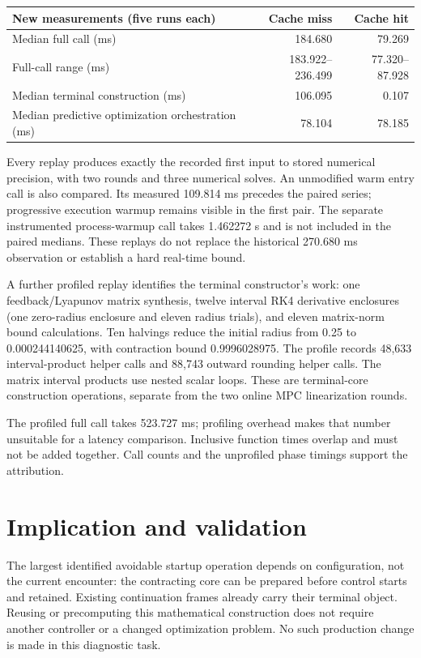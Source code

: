 \documentclass[11pt]{article}
\begin{document}
\begin{center}
\begin{tabular}{lrr}
\toprule
New measurements (five runs each) & Cache miss & Cache hit \\
\midrule
Median full call (ms) & 184.680 & 79.269 \\
Full-call range (ms) & 183.922--236.499 & 77.320--87.928 \\
Median terminal construction (ms) & 106.095 & 0.107 \\
Median predictive optimization orchestration (ms) & 78.104 & 78.185 \\
\bottomrule
\end{tabular}
\end{center}
Every replay produces exactly the recorded first input to stored numerical
precision, with two rounds and three numerical solves. An unmodified warm
entry call is also compared. Its measured 109.814 ms precedes the paired
series; progressive execution warmup remains visible in the first pair.
The separate instrumented process-warmup call takes 1.462272 s and is not
included in the paired medians. These replays do not replace the historical
270.680 ms observation or establish a hard real-time bound.

A further profiled replay identifies the terminal constructor's work:
one feedback/Lyapunov matrix synthesis, twelve interval RK4 derivative
enclosures (one zero-radius enclosure and eleven radius trials), and eleven
matrix-norm bound calculations. Ten halvings reduce the initial radius
from 0.25 to 0.000244140625, with contraction bound 0.9996028975.
The profile records 48,633 interval-product helper calls and 88,743 outward
rounding helper calls. The matrix interval products use nested scalar loops.
These are terminal-core construction operations, separate from the two
online MPC linearization rounds.

The profiled full call takes 523.727 ms; profiling overhead makes that number
unsuitable for a latency comparison. Inclusive function times overlap and
must not be added together. Call counts and the unprofiled phase timings
support the attribution.

\section{Implication and validation}
The largest identified avoidable startup operation depends on configuration,
not the current encounter: the contracting core can be prepared before
control starts and retained. Existing continuation frames already carry
their terminal object. Reusing or precomputing this mathematical construction
does not require another controller or a changed optimization problem.
No such production change is made in this diagnostic task.
\end{document}
